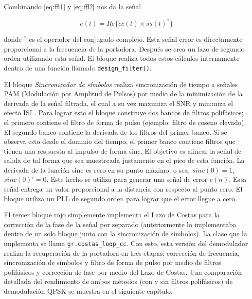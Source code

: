 Combinando \eqref{eq:ffl1} y \eqref{eq:ffl2} nos da la se\~nal

\begin{equation}
e(t)=Re\{cc(t) \times ss(t)^*\}
\end{equation}

donde $^*$ es el operador del conjugado complejo. Esta se\~nal error es directamente proporcional a la frecuencia de la
portadora. Despu\'es se crea un lazo de segundo orden utilizando esta se\~nal. El bloque realiza todos estos c\'alculos
internamente dentro de una funci\'on llamada \verb|design_filter()|.

El bloque \emph{Sincronizador de s\'imbolos} realiza sincronizaci\'on de tiempo a se\~nales PAM (Modulaci\'on por Amplitud
de Pulsos) por medio de la minimizaci\'on de la derivada de la se\~nal filtrada, el cual a su vez maximiza el SNR y minimiza el
efecto ISI \cite{radio}. Para lograr esto el bloque construye dos bancos de filtros polif\'asicos; el primero contiene el
filtro de forma de pulso (ejemplo: filtro de coseno elevado). El segundo banco contiene la derivada de los filtros del
primer banco. Si se observa esto desde el dominio del tiempo, el primer banco contiene filtros que tienen una respuesta al impulso
de forma sinc. El objetivo es alinear la se\~nal de salida de tal forma que sea muestreada justamente en el pico de esta
funci\'on. La derivada de la funci\'on sinc es cero en su punto m\'aximo, o sea, $sinc(0)=1$, $sinc(0)'=0$. Este hecho se
utiliza para generar una se\~nal de error $e(n)$. Esta se\~nal entrega un valor proporcional a la distancia con respecto al punto
cero. El bloque utiliza un PLL de segundo orden para lograr que el error llegue a cero.

El tercer bloque rojo simplemente implementa el Lazo de Costas para la correcci\'on de la fase de la se\~nal por separado
(anteriormente lo implementaba dentro de un solo bloque junto con la sincronizaci\'on de s\'imbolos). La clase que la
implementa se llama \verb|gr.costas_loop_cc|. Con esto, esta versi\'on del demodulador realiza la recuperaci\'on de la
portadora en tres etapas: correcci\'on de frecuencia, sincronizaci\'on de s\'imbolos y filtro de forma de pulso por medio de
filtros polif\'asicos y correcci\'on de fase por medio del Lazo de Costas. Una comparaci\'on detallada del rendimiento de
ambos m\'etodos (con y sin filtros polif\'asicos) de demodulaci\'on QPSK se muestra en el siguiente cap\'itulo.

